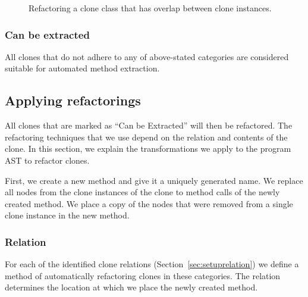 \begin{figure}[H]
\begin{parcolumns}{2}
\end{parcolumns}
\caption{Refactoring a clone class that has overlap between clone instances.}
\label{fig:overlaprefactoring}
\end{figure}

\subsubsection{Can be extracted}
All clones that do not adhere to any of above-stated categories are considered suitable for automated method extraction.

\subsection{Applying refactorings} \label{sec:applyingrefactorings}
All clones that are marked as ``Can be Extracted'' will then be refactored. The refactoring techniques that we use depend on the relation and contents of the clone. In this section, we explain the transformations we apply to the program AST to refactor clones.

First, we create a new method and give it a uniquely generated name. We replace all nodes from the clone instances of the clone to method calls of the newly created method. We place a copy of the nodes that were removed from a single clone instance in the new method.

\subsubsection{Relation}
For each of the identified clone relations (Section~\ref{sec:setuprelation}) we define a method of automatically refactoring clones in these categories. The relation determines the location at which we place the newly created method.

